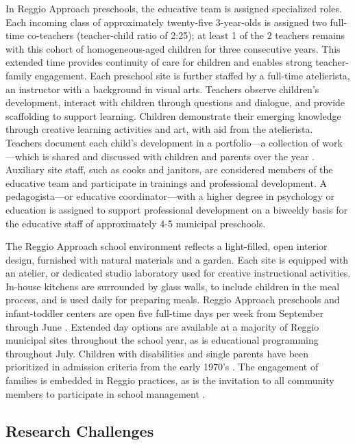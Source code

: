 In Reggio Approach preschools, the educative team is assigned specialized roles. Each incoming class of approximately twenty-five 3-year-olds is assigned two full-time co-teachers (teacher-child ratio of 2:25); at least 1 of the 2 teachers remains with this cohort of homogeneous-aged children for three consecutive years. This extended time provides continuity of care for children and enables strong teacher-family engagement. Each preschool site is further staffed by a full-time atelierista, an instructor with a background in visual arts. Teachers observe children's development, interact with children through questions and dialogue, and provide scaffolding to support learning. Children demonstrate their emerging knowledge through creative learning activities and art, with aid from the atelierista. Teachers document each child's development in a portfolio---a collection of work---which is shared and discussed with children and parents over the year \citep{Rinaldi_2006_ReggioEmilia_BOOK,Giudici-Nicolosi_2014_Reggio-Approach}. Auxiliary site staff, such as cooks and janitors, are considered members of the educative team and participate in trainings and professional development. A pedagogista---or educative coordinator---with a higher degree in psychology or education is assigned to support professional development on a biweekly basis for the educative staff of approximately 4-5 municipal preschools. 

The Reggio Approach school environment reflects a light-filled, open interior design, furnished with natural materials and a garden. Each site is equipped with an atelier, or dedicated studio laboratory used for creative instructional activities. In-house kitchens are surrounded by glass walls, to include children in the meal process, and is used daily for preparing meals. Reggio Approach preschools and infant-toddler centers are open five full-time days per week from September through June \citep{Giudici-Nicolosi_2014_Reggio-Approach}. Extended day options are available at a majority of Reggio municipal sites throughout the school year, as is educational programming throughout July. Children with disabilities and single parents have been prioritized in admission criteria from the early 1970's \citep{Edwards-etal-eds_1998_Hundred-Languages}. The engagement of families is embedded in Reggio practices, as is the invitation to all community members to participate in school management \citep{CEHD_2016_Historical-Analysis,Cagliari-etal-eds_2016_BOOK_Loris-Malaguzzi}. 

\subsection{Research Challenges}
